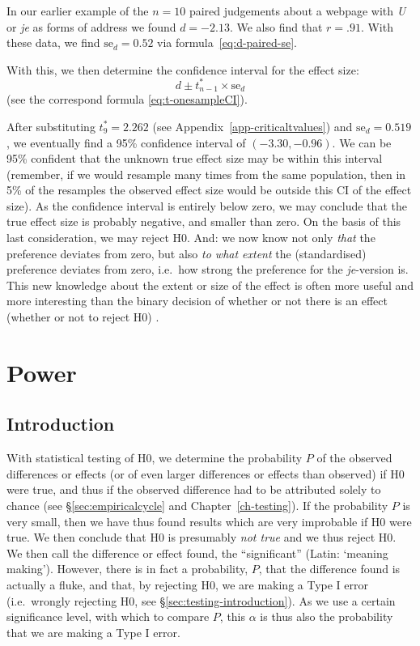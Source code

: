 \documentclass[
]{book}
\begin{document}
In
our earlier example of the \(n=10\) paired judgements about a webpage
with \emph{U} or \emph{je} as forms of address we found \(d=-2.13\). We also find
that \(r=.91\). With these data, we find \(\textrm{se}_d = 0.52\) via
formula~\eqref{eq:d-paired-se}.

With this, we then determine the confidence interval for the
effect size:
\begin{equation}
   \label{eq:d-paired-CI}
    d \pm t^*_{n-1} \times \textrm{se}_d 
\end{equation}
(see the correspond
formula \eqref{eq:t-onesampleCI}).

After substituting \(t^*_9=2.262\) (see Appendix~\ref{app-criticaltvalues}) and
\(\textrm{se}_d = 0.519\), we eventually find a 95\% confidence interval of \((-3.30,-0.96)\).
We can be 95\% confident that the unknown true effect size may be within this interval (remember, if we would resample many times from the same population, then in 5\% of the resamples the observed effect size would be outside this CI of the effect size). As the confidence interval is entirely below zero, we may conclude that the true effect size is probably negative, and smaller than zero. On the basis of this last consideration, we may reject H0.
And: we now know not only \emph{that} the preference deviates from zero, but
also \emph{to what extent} the (standardised) preference deviates from zero,
i.e.~how strong the preference for the \emph{je}-version is. This new knowledge
about the extent or size of the effect is often more useful and more interesting
than the binary decision of whether or not there is an effect (whether or not
to reject H0) \citep{Cumm12}.

\chapter{Power}\label{ch-power}

\section{Introduction}\label{sec:power-introduction}

With statistical testing of H0, we determine the probability \(P\) of the
observed differences or effects (or of even larger differences or effects
than observed) if H0 were true, and thus if
the observed difference had to be attributed solely to chance
(see §\ref{sec:empiricalcycle} and
Chapter~\ref{ch-testing}). If the probability \(P\) is very small, then
we have thus found results which are very improbable if H0 were true.
We then conclude that H0 is presumably \emph{not true} and we thus reject
H0. We then call the difference or effect found, the ``significant''
(Latin: `meaning making'). However, there is in fact a probability,
\(P\), that the difference found is actually a fluke, and that, by rejecting
H0, we are making a Type I error (i.e.~wrongly rejecting H0,
see
§\ref{sec:testing-introduction}). As we use a certain
significance level, with which to compare \(P\), this \(\alpha\)
is thus also the probability that we are making a Type I error.
\end{document}
